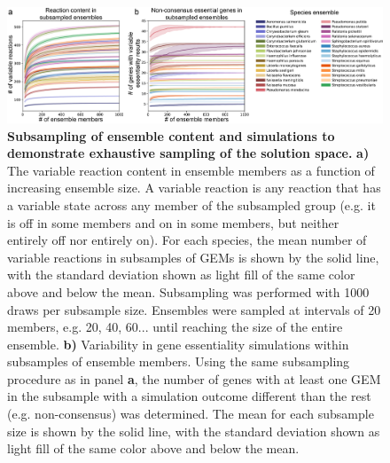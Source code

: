 \documentclass[11pt,twocolumn,notitlepage,openany,twoside]{book}
\begin{document}
\begin{refsection}
\begin{figure}[tb]
\centering
\includegraphics[width=\textwidth]{ch3_fig2}
\caption[ Subsampling of ensemble content and simulations to demonstrate exhaustive sampling of the solution space.]{\textbf{ Subsampling of ensemble content and simulations to demonstrate exhaustive sampling of the solution space.} \textbf{a)} The variable reaction content in ensemble members as a function of increasing ensemble size. A variable reaction is any reaction that has a variable state across any member of the subsampled group (e.g. it is off in some members and on in some members, but neither entirely off nor entirely on). For each species, the mean number of variable reactions in subsamples of GEMs is shown by the solid line, with the standard deviation shown as light fill of the same color above and below the mean. Subsampling was performed with 1000 draws per subsample size. Ensembles were sampled at intervals of 20 members, e.g. 20, 40, 60... until reaching the size of the entire ensemble. \textbf{b)} Variability in gene essentiality simulations within subsamples of ensemble members. Using the same subsampling procedure as in panel \textbf{a}, the number of genes with at least one GEM in the subsample with a simulation outcome different than the rest (e.g. non-consensus) was determined. The mean for each subsample size is shown by the solid line, with the standard deviation shown as light fill of the same color above and below the mean.}
\end{figure}


\end{refsection}
\end{document}
